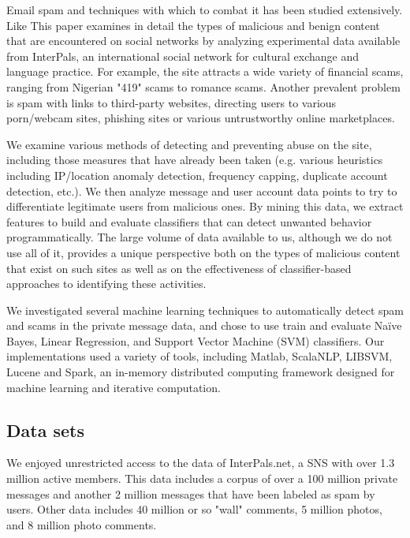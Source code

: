 \documentclass[preprint]{acm_proc_article-sp}
\begin{document}
Email spam and techniques with which to combat it has been studied 
extensively. Like
This paper examines in detail the types of malicious and benign
content that are encountered on social networks by analyzing
experimental data available from InterPals, an international social network
for cultural exchange and language practice. For example, the site
attracts a wide variety of financial scams, ranging from Nigerian
"419" scams to romance scams. Another prevalent problem is spam with
links to third-party websites, directing users to various porn/webcam
sites, phishing sites or various untrustworthy online marketplaces.

We examine various methods of detecting and preventing abuse
on the site, including those measures that have already been taken
(e.g. various heuristics including IP/location anomaly detection,
frequency capping, duplicate account detection, etc.). We then analyze 
message and user account data points to try to differentiate legitimate users
from malicious ones. By mining this data, we extract features 
to build and evaluate classifiers that can detect unwanted behavior 
programmatically. The large volume of data available to us, although we do 
not use all of it, provides a unique perspective both on the types of
malicious content that exist on such sites as well as on the
effectiveness of classifier-based approaches to identifying
these activities.

We investigated several machine learning techniques to automatically 
detect spam and scams in the private message data, and chose to use 
train and evaluate Na\"ive Bayes, Linear Regression, and 
Support Vector Machine (SVM) classifiers. Our implementations used 
a variety of tools, including Matlab, ScalaNLP, LIBSVM, Lucene and Spark, 
an in-memory distributed computing framework designed for machine 
learning and iterative computation.


\subsection{Data sets}

We enjoyed unrestricted access to the data of InterPals.net, a SNS with 
over 1.3 million active members. This data includes a corpus of over a 
100 million private messages and another 2 million messages that have been 
labeled as spam by users. Other data includes 40 million or so "wall" 
comments, 5 million photos, and 8 million photo comments. 


\end{document}
